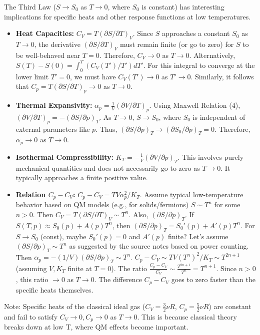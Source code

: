 \documentclass[11pt]{article}
\begin{document}
The Third Law ($S \to S_0$ as $T \to 0$, where $S_0$ is constant) has interesting implications for specific heats and other response functions at low temperatures.
\begin{itemize}
    \item \textbf{Heat Capacities:} $C_V = T (\partial S / \partial T)_V$. Since $S$ approaches a constant $S_0$ as $T \to 0$, the derivative $(\partial S / \partial T)_V$ must remain finite (or go to zero) for $S$ to be well-behaved near $T=0$. Therefore, $C_V \to 0$ as $T \to 0$.
    Alternatively, $S(T) - S(0) = \int_0^T (C_V(T')/T') dT'$. For this integral to converge at the lower limit $T'=0$, we must have $C_V(T') \to 0$ as $T' \to 0$.
    Similarly, it follows that $C_p = T (\partial S / \partial T)_p \to 0$ as $T \to 0$.

    \item \textbf{Thermal Expansivity:} $\alpha_p = \frac{1}{V} (\partial V / \partial T)_p$. Using Maxwell Relation (4), $(\partial V / \partial T)_p = -(\partial S / \partial p)_T$. As $T \to 0$, $S \to S_0$, where $S_0$ is independent of external parameters like $p$. Thus, $(\partial S / \partial p)_T \to (\partial S_0 / \partial p)_T = 0$.
    Therefore, $\alpha_p \to 0$ as $T \to 0$.

    \item \textbf{Isothermal Compressibility:} $K_T = -\frac{1}{V} (\partial V / \partial p)_T$. This involves purely mechanical quantities and does not necessarily go to zero as $T \to 0$. It typically approaches a finite positive value.

    \item \textbf{Relation $C_p - C_V$:}
    $C_p - C_V = TV \alpha_p^2 / K_T$.
    Assume typical low-temperature behavior based on QM models (e.g., for solids/fermions) $S \sim T^n$ for some $n>0$.
    Then $C_V = T(\partial S/\partial T)_V \sim T^n$.
    Also, $(\partial S/\partial p)_T$. If $S(T,p) \approx S_0(p) + A(p) T^n$, then $(\partial S/\partial p)_T = S_0'(p) + A'(p)T^n$. For $S\to S_0$ (const), maybe $S_0'(p)=0$ and $A'(p)$ finite? Let's assume $(\partial S/\partial p)_T \sim T^n$ as suggested by the source notes based on power counting.
    Then $\alpha_p = -(1/V)(\partial S/\partial p)_T \sim T^n$.
    $C_p - C_V \sim T V (T^n)^2 / K_T \sim T^{2n+1}$ (assuming $V, K_T$ finite at $T=0$).
    The ratio $\frac{C_p - C_V}{C_V} \sim \frac{T^{2n+1}}{T^n} = T^{n+1}$. Since $n>0$, this ratio $\to 0$ as $T \to 0$.
    The difference $C_p - C_V$ goes to zero faster than the specific heats themselves.
\end{itemize}
Note: Specific heats of the classical ideal gas ($C_V = \frac{3}{2}\nu R$, $C_p = \frac{5}{2}\nu R$) are constant and fail to satisfy $C_V \to 0, C_p \to 0$ as $T \to 0$. This is because classical theory breaks down at low T, where QM effects become important.
\end{document}

